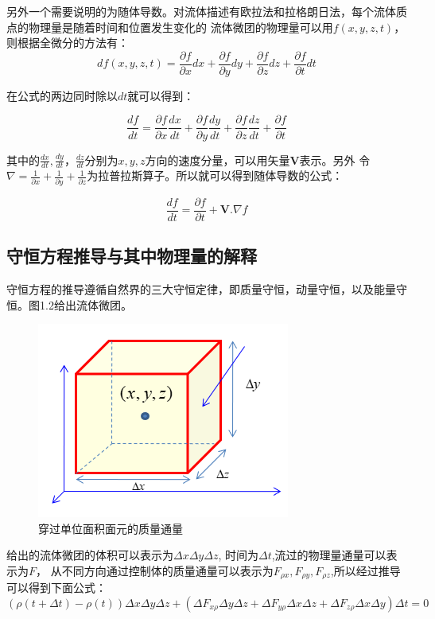 \documentclass[11pt,twoside]{article}
\begin{document}
另外一个需要说明的为随体导数。对流体描述有欧拉法和拉格朗日法，每个流体质点的物理量是随着时间和位置发生变化的
流体微团的物理量可以用$f(x,y,z,t)$，则根据全微分的方法有：
$$df(x,y,z,t) = \frac{\partial f}{\partial x} dx + \frac{\partial f}{\partial y} dy + \frac{\partial f}{\partial z} dz + \frac{\partial f}{\partial t} dt$$

在公式的两边同时除以$dt$就可以得到：

$$\frac{df}{dt} = \frac{\partial f}{\partial x} \frac{dx}{dt} + \frac{\partial f}{\partial y} \frac{dy}{dt} + \frac{\partial f}{\partial z} \frac{dz}{dt} + \frac{\partial f}{\partial t}$$

其中的$\frac{dx}{dt},\frac{dy}{dt}，\frac{dz}{dt}$分别为$x,y,z$方向的速度分量，可以用矢量$\bm{V}$表示。另外
令$\nabla = \frac{1}{\partial x} + \frac{1}{\partial y} +\frac{1}{\partial z}$为拉普拉斯算子。所以就可以得到随体导数的公式：

$$\frac{df}{dt} = \frac{\partial f}{\partial t} + \bm{V}.\nabla f$$

\subsection{守恒方程推导与其中物理量的解释}

守恒方程的推导遵循自然界的三大守恒定律，即质量守恒，动量守恒，以及能量守恒。图1.2给出流体微团。
\begin{figure}[htbp]
    \begin{center}
        \includegraphics{微分推导守恒方程.jpg}
    \end{center}
    \caption{穿过单位面积面元的质量通量}
\end{figure}

给出的流体微团的体积可以表示为$\Delta  x\Delta y \Delta z$, 时间为$\Delta t$,流过的物理量通量可以表示为$F$，
从不同方向通过控制体的质量通量可以表示为$F_{\rho x}, F_{\rho y}, F_{\rho z}$,所以经过推导可以得到下面公式：
$$(\rho(t+\Delta t) - \rho(t))\Delta x \Delta y \Delta z + (\Delta F_{x\rho}\Delta y \Delta z+\Delta F_{y\rho}\Delta x \Delta z + \Delta F_{z\rho}\Delta x \Delta y)\Delta t = 0$$
\end{document}
